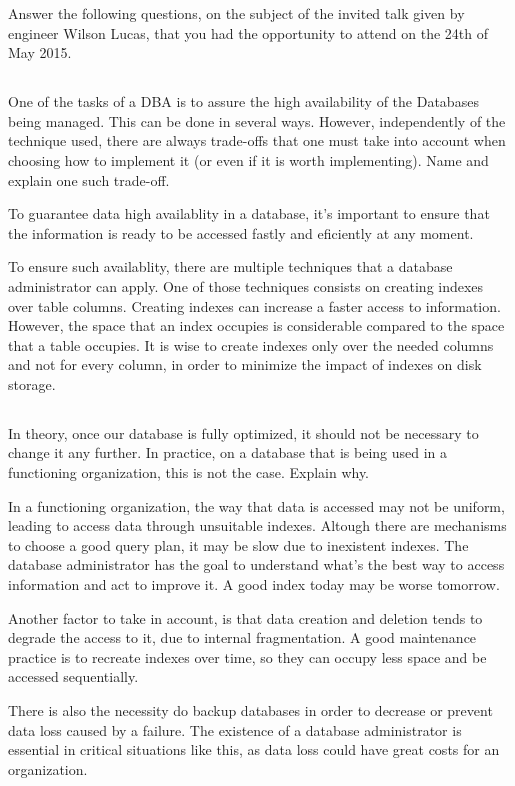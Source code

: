 {\color{gray}Answer the following questions, on the subject of the invited talk given by engineer Wilson Lucas, that you had the opportunity to attend on the 24th of May 2015.}

	\subsection{}
	
{\color{gray}One of the tasks of a DBA is to assure the high availability of the Databases being managed. This can be done in several ways. However, independently of the technique used, there are always trade-offs that one must take into account when choosing how to implement it (or even if it is worth implementing). Name and explain one such trade-off.}

To guarantee data high availablity in a database, it's important to ensure that the information is ready to be accessed fastly and eficiently at any moment.

To ensure such availablity, there are multiple techniques that a database administrator can apply. One of those techniques consists on creating indexes over table columns. Creating indexes can increase a faster access to information. However, the space that an index occupies is considerable compared to the space that a table occupies. It is wise to create indexes only over the needed columns and not for every column, in order to minimize the impact of indexes on disk storage.

	\subsection{}

{\color{gray}In theory, once our database is fully optimized, it should not be necessary to change it any further. In practice, on a database that is being used in a functioning organization, this is not the case. Explain why.}

	In a functioning organization, the way that data is accessed may not be uniform, leading to access data through unsuitable indexes. Altough there are mechanisms to choose a good query plan, it may be slow due to inexistent indexes. The database administrator has the goal to understand what's the best way to access information and act to improve it. A good index today may be worse tomorrow. 

	Another factor to take in account, is that data creation and deletion tends to degrade the access to it, due to internal fragmentation. A good maintenance practice is to recreate indexes over time, so they can occupy less space and be accessed sequentially.

	There is also the necessity do backup databases in order to decrease or prevent data loss caused by a failure. The existence of a database administrator is essential in critical situations like this, as data loss could have great costs for an organization.